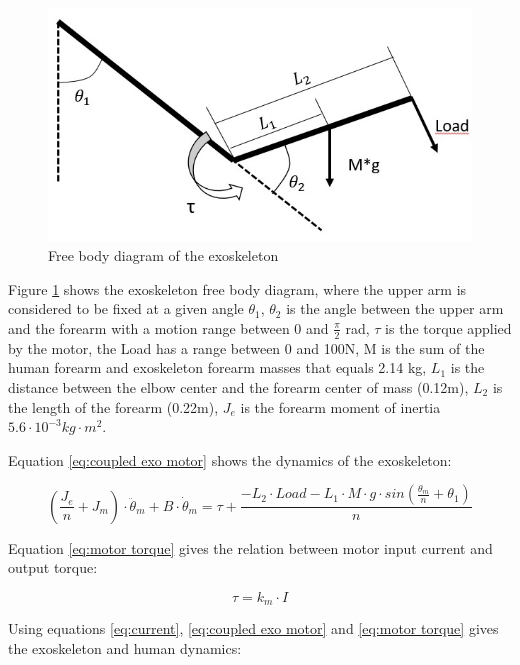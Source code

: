 \begin{figure}[thpb]
      \centering
      \includegraphics[scale=0.5]{Images/DCL_exoesqueleto.jpg}
      \caption{Free body diagram of the exoskeleton}
      \label{exoskeleton fbd}
   \end{figure}

Figure \ref{exoskeleton fbd} shows the exoskeleton free body diagram, where the upper arm is considered to be fixed at a given angle \(\theta_1\), \(\theta_2\) is the angle between the upper arm and the forearm with a motion range between 0 and \(\frac{\pi}{2}\) rad, \(\tau\) is the torque applied by the motor, the Load has a range between 0 and 100N, M is the sum of the human forearm and exoskeleton forearm masses that equals 2.14 kg, \(L_1\) is the distance between the elbow center and the forearm center of mass (0.12m), \(L_2\) is the length of the forearm (0.22m), \(J_e\) is the forearm moment of inertia \(5.6 \cdot 10^{-3}  kg\cdot m^2\).

Equation \ref{eq:coupled exo motor} shows the dynamics of the exoskeleton:

\begin{equation}
\label{eq:coupled exo motor}
\left(\frac{J_e}{n}+J_m\right)\cdot \ddot{\theta}_m+B \cdot \dot{\theta}_m = \tau + \frac{-L_2 \cdot Load - L_1 \cdot M \cdot g \cdot sin\left(\frac{\theta_m}{n}+\theta_1\right)}{n}
\end{equation}
   
   Equation \ref{eq:motor torque} gives the relation between motor input current and output torque:
   
   \begin{equation}
\label{eq:motor torque}
\tau = k_m \cdot I
\end{equation}

Using equations \ref{eq:current}, \ref{eq:coupled exo motor} and \ref{eq:motor torque} gives the exoskeleton and human dynamics:

